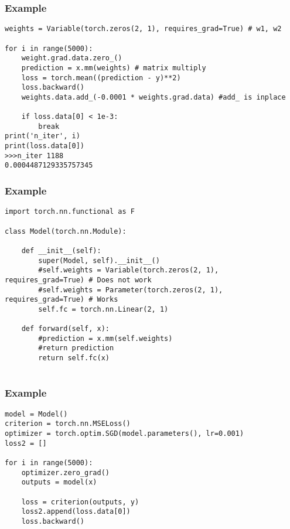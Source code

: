 \begin{frame}[fragile]
\frametitle{Example}
\begin{lstlisting}
weights = Variable(torch.zeros(2, 1), requires_grad=True) # w1, w2

for i in range(5000):
	weight.grad.data.zero_()
    prediction = x.mm(weights) # matrix multiply
    loss = torch.mean((prediction - y)**2)
    loss.backward()
    weights.data.add_(-0.0001 * weights.grad.data) #add_ is inplace
    
    if loss.data[0] < 1e-3:
        break
print('n_iter', i)
print(loss.data[0])
>>>n_iter 1188
0.0004487129335757345
\end{lstlisting}     
\end{frame} 

\begin{frame}[fragile]
\frametitle{Example}
\begin{lstlisting}
import torch.nn.functional as F

class Model(torch.nn.Module):
    
    def __init__(self):
        super(Model, self).__init__()
        #self.weights = Variable(torch.zeros(2, 1), requires_grad=True) # Does not work
		#self.weights = Parameter(torch.zeros(2, 1), requires_grad=True) # Works
		self.fc = torch.nn.Linear(2, 1)
    
    def forward(self, x):
        #prediction = x.mm(self.weights)
        #return prediction
		return self.fc(x) 
        
\end{lstlisting}     
\end{frame} 

\begin{frame}[fragile]
\frametitle{Example}
\begin{lstlisting}
model = Model()
criterion = torch.nn.MSELoss()
optimizer = torch.optim.SGD(model.parameters(), lr=0.001)
loss2 = []

for i in range(5000):
    optimizer.zero_grad()
    outputs = model(x)
    
    loss = criterion(outputs, y)
    loss2.append(loss.data[0])
    loss.backward()        
\end{lstlisting}     
\end{frame} 



